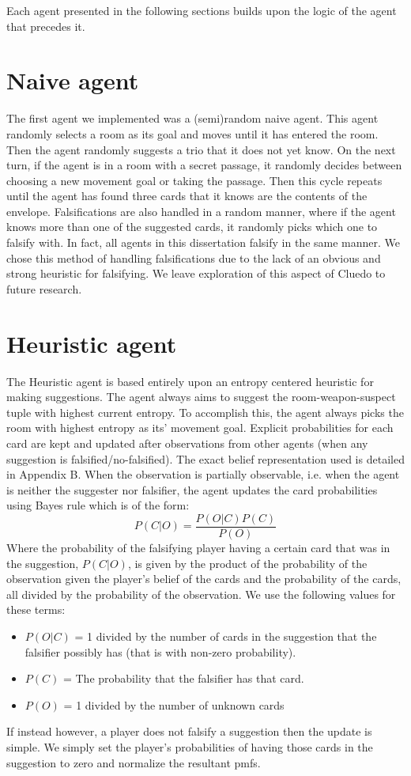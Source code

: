 \documentclass[msc, ai, logo, twoside, notimes, parskip, leftchapter, normalheadings]{infthesis}
\begin{document}
Each agent presented in the following sections builds upon the logic of the agent that precedes it. 

\section{Naive agent}
The first agent we implemented was a (semi)random naive agent. This agent randomly selects a room as its goal and moves until it has entered the room. Then the agent randomly suggests a trio that it does not yet know. On the next turn, if the agent is in a room with a secret passage, it randomly decides between choosing a new movement goal or taking the passage. Then this cycle repeats until the agent has found three cards that it knows are the contents of the envelope. Falsifications are also handled in a random manner, where if the agent knows more than one of the suggested cards, it randomly picks which one to falsify with. In fact, all agents in this dissertation falsify in the same manner. We chose this method of handling falsifications due to the lack of an obvious and strong heuristic for falsifying. We leave exploration of this aspect of Cluedo to future research.

\section{Heuristic agent}
The Heuristic agent is based entirely upon an entropy centered heuristic for making suggestions. The agent always aims to suggest the room-weapon-suspect tuple with highest current entropy. To accomplish this, the agent always picks the room with highest entropy as its' movement goal. Explicit probabilities for each card are kept and updated after observations from other agents (when any suggestion is falsified/no-falsified). The exact belief representation used is detailed in Appendix B. When the observation is partially observable, i.e. when the agent is neither the suggester nor falsifier, the agent updates the card probabilities using Bayes rule which is of the form:
\begin{equation}
P(C|O) = \frac{P(O|C) P(C)}{P(O)}
\end{equation}
Where the probability of the falsifying player having a certain card that was in the suggestion, \(P(C|O)\), is given by the product of the probability of the observation given the player's belief of the cards and the probability of the cards, all divided by the probability of the observation. We use the following values for these terms:
\begin{itemize}
\item \(P(O|C)\) = 1 divided by the number of cards in the suggestion that the falsifier possibly has (that is with non-zero probability).
\item \(P(C)\) = The probability that the falsifier has that card.
\item \(P(O)\) = 1 divided by the number of unknown cards
\end{itemize}
If instead however, a player does not falsify a suggestion then the update is simple. We simply set the player's probabilities of having those cards in the suggestion to zero and normalize the resultant pmfs.
\end{document}
